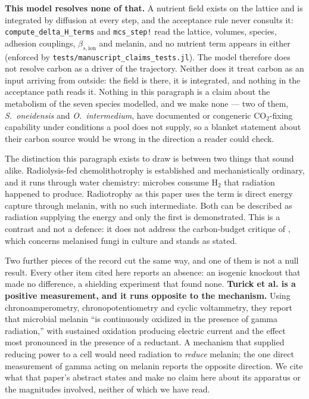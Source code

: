 \documentclass[11pt]{article}
\begin{document}
\textbf{This model resolves none of that.} A nutrient field exists on the lattice and is
integrated by diffusion at every step, and the acceptance rule never consults it:
\texttt{compute\_delta\_H\_terms} and \texttt{mcs\_step!} read the lattice, volumes, species,
adhesion couplings, $\beta_{s,\mathrm{ion}}$ and melanin, and no nutrient term appears in either
(enforced by \texttt{tests/manuscript\_claims\_tests.jl}). The model therefore does not resolve
carbon as a driver of the trajectory. Neither does it treat carbon as an input arriving from
outside: the field is there, it is integrated, and nothing in the acceptance path reads it. Nothing in this paragraph is a claim about the metabolism of the
seven species modelled, and we make none --- two of them, \textit{S.\ oneidensis} and
\textit{O.\ intermedium}, have documented or congeneric CO$_2$-fixing capability under conditions a
pool does not supply, so a blanket statement about their carbon source would be wrong in the
direction a reader could check.

The distinction this paragraph exists to draw is between two things that sound alike.
Radiolysis-fed chemolithotrophy is established and mechanistically ordinary, and it runs through
water chemistry: microbes consume H$_2$ that radiation happened to produce. Radiotrophy as this
paper uses the term is direct energy capture through melanin, with no such intermediate. Both can be
described as radiation supplying the energy and only the first is demonstrated. This is a contrast
and not a defence: it does not address the carbon-budget critique of \cite{walberg2015}, which
concerns melanised fungi in culture and stands as stated.

Two further pieces of the record cut the same way, and one of them is not a null result.
Every other item cited here reports an absence: an isogenic knockout that made no
difference, a shielding experiment that found none. \textbf{Turick et al.
\cite{turick2011} is a positive measurement, and it runs opposite to the mechanism.}
Using chronoamperometry, chronopotentiometry and cyclic voltammetry, they report that
microbial melanin ``is continuously oxidized in the presence of gamma radiation,'' with
sustained oxidation producing electric current and the effect most pronounced in the
presence of a reductant. A mechanism that supplied reducing power to a cell would need
radiation to \emph{reduce} melanin; the one direct measurement of gamma acting on melanin
reports the opposite direction. We cite what that paper's abstract states and make no claim
here about its apparatus or the magnitudes involved, neither of which we have read.
\end{document}

